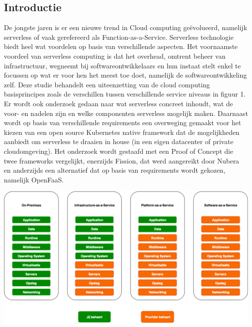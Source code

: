 \documentclass[a0,portrait]{a0poster}
\begin{document}
\begin{multicols}{2}
\section*{Introductie}
\color{black}
\color{black}
De jongste jaren is er een nieuwe trend in Cloud computing geëvolueerd, namelijk serverless of vaak gerefereerd als Function-as-a-Service. Serverless technologie biedt heel wat voordelen op basis van verschillende aspecten. Het voornaamste voordeel van serverless computing is dat het overhead, omtrent beheer van infrastructuur, wegneemt bij softwareontwikkelaars en hun instaat stelt enkel te focussen op wat er voor hen het meest toe doet, namelijk de softwareontwikkeling zelf.
Deze studie behandelt een uiteenzetting van de cloud computing basisprincipes zoals de verschillen tussen verschillende service niveaus in figuur 1. Er wordt ook onderzoek gedaan naar wat serverless concreet inhoudt, wat de voor- en nadelen zijn en welke componenten serverless mogelijk maken. Daarnaast wordt op basis van verschillende requirements een overweging gemaakt voor het kiezen van een open source Kubernetes native framework dat de mogelijkheden aanbiedt om serverless te draaien in house (in een eigen datacenter of private cloudomgeving). Het onderzoek wordt gestaafd met een Proof of Concept die twee frameworks vergelijkt, enerzijds Fission, dat werd aangereikt door Nubera en anderzijds een alternatief dat op basis van requirements wordt gekozen, namelijk OpenFaaS.
\\
\begin{center}\vspace{1cm}
    \includegraphics[width=0.8\linewidth]{service-niveaus}
    \label{fig:service-niveaus}
\end{center}\vspace{1cm}


\end{multicols}
\end{document}
